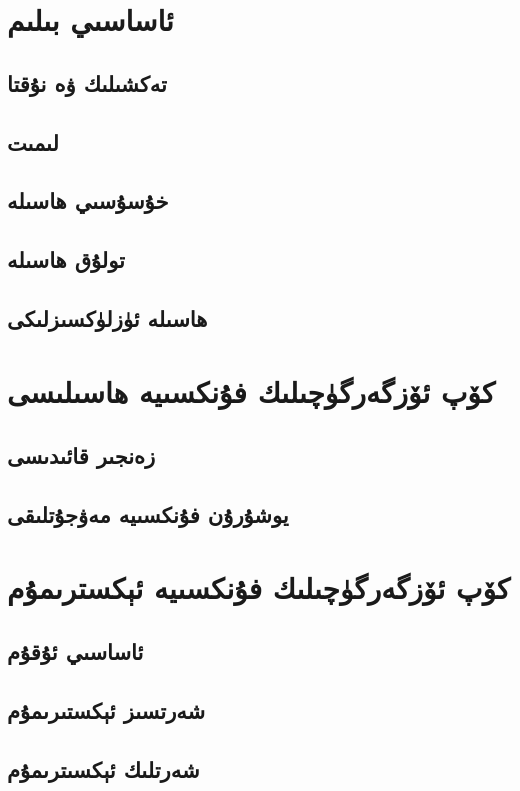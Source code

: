 
\section{ئاساسىي بىلىم}
\subsection{تەكشىلىك ۋە نۇقتا}
\subsection{لىمىت}
\subsection{خۇسۇسىي ھاسىلە}
\subsection{تولۇق ھاسىلە}
\subsection{ھاسىلە ئۈزلۈكسىزلىكى}
\section{كۆپ ئۆزگەرگۈچىلىك فۇنكسىيە ھاسىلىسى}
\subsection{زەنجىر قائىدىسى}
\subsection{يوشۇرۇن فۇنكسىيە مەۋجۇتلىقى}

\section{كۆپ ئۆزگەرگۈچىلىك فۇنكسىيە ئېكسترىمۇم }
\subsection{ئاساسىي ئۇقۇم}
\subsection{شەرتسىز ئېكستىرىمۇم}
\subsection{شەرتلىك ئېكسىترىمۇم}

